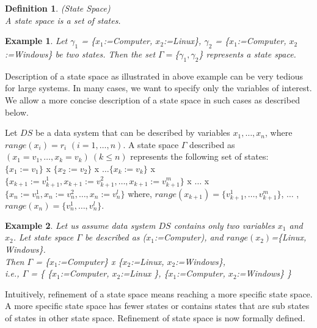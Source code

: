 \documentclass[12pt,journal,letterpaper,onecolumn]{IEEEtran}
\newtheorem{definition}{Definition}[section]
\newtheorem{example}{Example}[section]
\begin{document}
\begin{definition}(State Space)\\
A state space is a set of states.
 \label{def:statespace}
\end{definition}

\begin{example} Let $\gamma_1$ = \{$x_1$:={\ttfamily Computer}, $x_2$:={\ttfamily Linux}\},
     $\gamma_2$ = \{$x_1$:={\ttfamily Computer}, $x_2$:={\ttfamily Windows}\} be two states.
     Then the set $\Gamma = $\{$\gamma_1, \gamma_2$\} represents a state space.
\label{eg:statespace1}
\end{example}

Description of a state space as illustrated
in above example can be very tedious for large systems. In many cases,
we want to specify only the variables of interest. We allow a more concise
description of a state space in such cases as described below.

Let $DS$ be a data system that can be described by variables
$x_1, \ldots, x_n$, where $range(x_i)=r_i$ $(i=1,\ldots,n)$.
A state space $\Gamma$  described as $(x_1=v_1,
\ldots, x_k=v_k)~(k \leq n)$ represents the following set of states:\\
$\{x_1:=v_1\}$ x $\{x_2:=v_2\}$ x $\ldots \{x_k:=v_k\}$ x
$\{x_{k+1}:=v_{k+1}^1,
 x_{k+1}:=v_{k+1}^2,\ldots,x_{k+1}:=v_{k+1}^m \}$ x
   $\ldots$ x
 $\{x_n:=v_n^1,x_n:=v_n^2,\ldots,x_n:=v_n^l\}$
 where,  $range(x_{k+1}) = \{v_{k+1}^1,\ldots, v_{k+1}^m\}$, $\ldots$ ,
 $range(x_n)=\{v_n^1,\ldots,v_n^l\}.$

\begin{example}
Let us assume data system $DS$ contains only two variables $x_1$ and $x_2$.
Let state space $\Gamma$ be described as ($x_1$:={\ttfamily Computer}), and
 $range(x_2)$=\{{\ttfamily Linux, Windows}\}. \\
 Then $\Gamma$ = \{$x_1$:={\ttfamily Computer}\} x \{$x_2$:={\ttfamily Linux}, $x_2$:={\ttfamily Windows}\}, \\
 i.e., $\Gamma$ = \{ \{$x_1$:={\ttfamily Computer}, $x_2$:={\ttfamily Linux} \},
                     \{$x_1$:={\ttfamily Computer}, $x_2$:={\ttfamily Windows}\}
                   \}
\label{eg:statespace2}
\end{example}


Intuitively, refinement of a state space means reaching a more
specific state space. A more specific state space has fewer states or
contains states that are sub states of states in other state space.
Refinement of state space is now formally defined.
\end{document}

